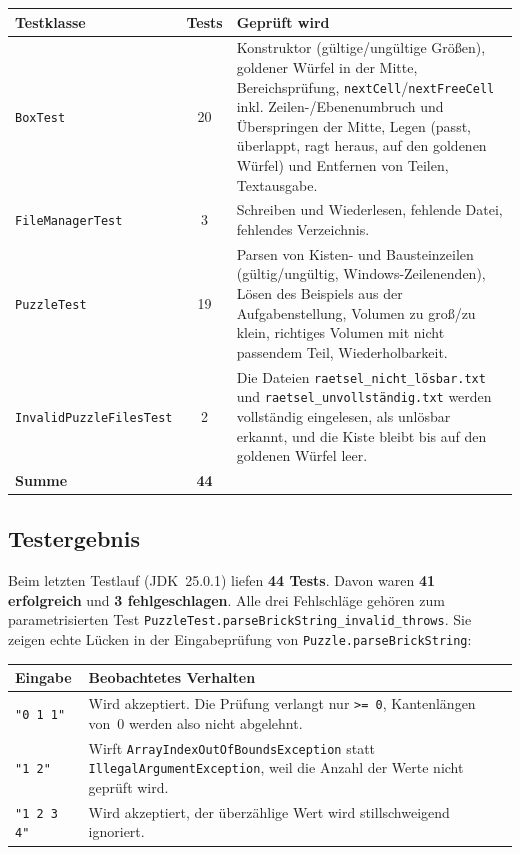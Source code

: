 \documentclass[11pt,a4paper,parskip=half]{scrartcl}
\newcommand{\code}[1]{\texttt{#1}}
\newcommand{\file}[1]{\texttt{#1}}
\begin{document}
\begin{center}
\begin{tabularx}{\textwidth}{@{}lcX@{}}
\toprule
\textbf{Testklasse} & \textbf{Tests} & \textbf{Geprüft wird} \\
\midrule
\code{BoxTest} & 20 &
  Konstruktor (gültige/ungültige Größen), goldener Würfel in der Mitte,
  Bereichsprüfung, \code{nextCell}/\code{nextFreeCell} inkl. Zeilen-/Ebenenumbruch
  und Überspringen der Mitte, Legen (passt, überlappt, ragt heraus, auf den
  goldenen Würfel) und Entfernen von Teilen, Textausgabe. \\
\code{FileManagerTest} & 3 &
  Schreiben und Wiederlesen, fehlende Datei, fehlendes Verzeichnis. \\
\code{PuzzleTest} & 19 &
  Parsen von Kisten- und Bausteinzeilen (gültig/ungültig, Windows-Zeilenenden),
  Lösen des Beispiels aus der Aufgabenstellung, Volumen zu groß/zu klein,
  richtiges Volumen mit nicht passendem Teil, Wiederholbarkeit. \\
\code{InvalidPuzzleFilesTest} & 2 &
  Die Dateien \file{raetsel\_nicht\_lösbar.txt} und
  \file{raetsel\_unvollständig.txt} werden vollständig eingelesen, als unlösbar
  erkannt, und die Kiste bleibt bis auf den goldenen Würfel leer. \\
\midrule
\textbf{Summe} & \textbf{44} & \\
\bottomrule
\end{tabularx}
\end{center}

\subsection{Testergebnis}

Beim letzten Testlauf (JDK~25.0.1) liefen \textbf{44 Tests}. Davon waren \textbf{41
erfolgreich} und \textbf{3 fehlgeschlagen}. Alle drei Fehlschläge gehören zum
parametrisierten Test \code{PuzzleTest.\allowbreak parseBrickString\_\allowbreak invalid\_\allowbreak throws}. Sie
zeigen echte Lücken in der Eingabeprüfung von \code{Puzzle.parseBrickString}:

\begin{center}
\begin{tabularx}{\textwidth}{@{}lX@{}}
\toprule
\textbf{Eingabe} & \textbf{Beobachtetes Verhalten} \\
\midrule
\code{"0 1 1"} & Wird akzeptiert. Die Prüfung verlangt nur
  \code{>= 0}, Kantenlängen von~0 werden also nicht abgelehnt. \\
\code{"1 2"} & Wirft \code{ArrayIndexOutOfBoundsException} statt
  \code{IllegalArgumentException}, weil die Anzahl der Werte nicht geprüft wird. \\
\code{"1 2 3 4"} & Wird akzeptiert, der überzählige Wert wird stillschweigend
  ignoriert. \\
\bottomrule
\end{tabularx}
\end{center}
\end{document}
